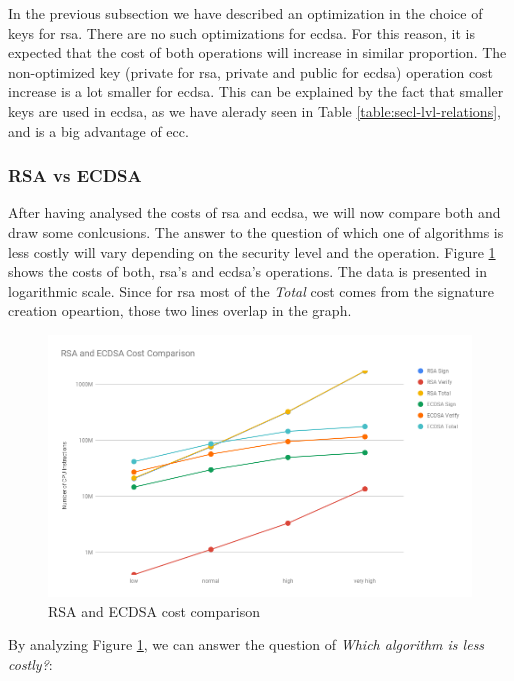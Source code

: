 \documentclass{llncs}
\begin{document}
In the previous subsection we have described an optimization in the choice of keys for \gls{rsa}. There are no such optimizations 
for \gls{ecdsa}. For this reason, it is expected that the cost of both operations will increase in similar proportion. The non-optimized
key (private for \gls{rsa}, private and public for \gls{ecdsa}) operation cost increase is a lot smaller for \gls{ecdsa}. This can be
explained by the fact that smaller keys are used in \gls{ecdsa}, as we have alerady seen in Table \ref{table:secl-lvl-relations},
and is a big advantage of \gls{ecc}.

\subsubsection{RSA vs ECDSA} \label{sec:rsa-vs-ecdsa}

After having analysed the costs of \gls{rsa} and \gls{ecdsa}, we will now compare both and draw some conlcusions. The answer to the
question of which one of algorithms is less costly will vary depending on the security level and the operation. Figure \ref{fig:ecdsa-rsa-costs-all}
shows the costs of both, \gls{rsa}'s and \gls{ecdsa}'s operations. The data is presented in logarithmic scale. Since for \gls{rsa} most
of the \textit{Total} cost comes from the signature creation opeartion, those two lines overlap in the graph.

\begin{figure}
  \centering
  \includegraphics[width=1.0\textwidth]{img/rsa_ecdsa_costs_all.png}
  \caption{\label{fig:ecdsa-rsa-costs-all} RSA and ECDSA cost comparison}
\end{figure}

By analyzing Figure \ref{fig:ecdsa-rsa-costs-all}, we can answer the question of \textit{Which algorithm is less costly?}:
\end{document}
